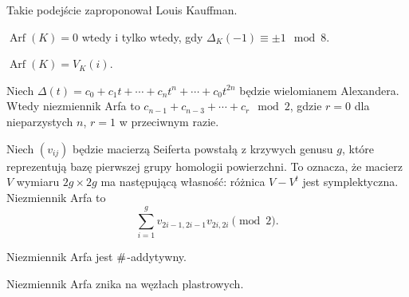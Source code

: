 Takie podejście zaproponował Louis Kauffman.

\begin{proposition}[Murasugi]
	$\operatorname{Arf}(K) = 0$ wtedy i tylko wtedy, gdy $\Delta_K(-1) \equiv \pm 1 \mod 8$.
\end{proposition}

\begin{proposition}[Jones, 1985]
	$\operatorname{Arf}(K) = V_K(i)$.
\end{proposition}

\begin{proposition}[Robertello]
	Niech $ \Delta (t)=c_{0}+c_{1}t+\cdots +c_{n}t^{n}+\cdots +c_{0}t^{2n}$ będzie wielomianem Alexandera.
	Wtedy niezmiennik Arfa to $ c_{n-1}+c_{n-3}+\cdots +c_{r}\mod 2$, gdzie $r = 0$ dla nieparzystych $n$, $r = 1$ w przeciwnym razie.
\end{proposition}

\begin{proposition}
	Niech $(v_{ij})$ będzie macierzą Seiferta powstałą z krzywych genusu $g$, które reprezentują bazę pierwszej grupy homologii powierzchni.
	To oznacza, że macierz $V$ wymiaru $2g \times 2g$ ma następującą własność: różnica $V - V^t$ jest symplektyczna.
	Niezmiennik Arfa to
	\[
		\sum^g_{i=1}v_{2i-1,2i-1}v_{2i,2i} \pmod 2.
	\]
\end{proposition}

\begin{proposition}
	Niezmiennik Arfa jest $\mathbin{\#}$-addytywny.
\end{proposition}

\begin{proposition}
	Niezmiennik Arfa znika na węzłach plastrowych.
\end{proposition}


